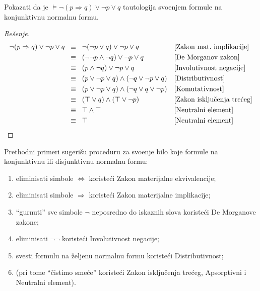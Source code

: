 \clearpage
    
    \begin{EX}
      Pokazati da je $\vDash \lnot(p \Rightarrow q) \lor \lnot p \lor q$ tautologija svo\dj enjem formule na konjunktivnu normalnu formu.
    \end{EX}
    \begin{proof}[Re\v senje]
      \begin{align*}
        \lnot(p \Rightarrow q) \lor \lnot p \lor q
        &\;\;\equiv\;\; \lnot(\lnot p \lor q) \lor \lnot p \lor q                   && \text{[Zakon mat.\ implikacije]}\\
        &\;\;\equiv\;\; (\lnot\lnot p \land \lnot q) \lor \lnot p \lor q            && \text{[De Morganov zakon]}\\
        &\;\;\equiv\;\; (p \land \lnot q) \lor \lnot p \lor q                       && \text{[Involutivnost negacije]}\\
        &\;\;\equiv\;\; (p \lor \lnot p \lor q) \land (\lnot q \lor \lnot p \lor q) && \text{[Distributivnost]}\\
        &\;\;\equiv\;\; (p \lor \lnot p \lor q) \land (\lnot q \lor q \lor \lnot p) && \text{[Komutativnost]}\\
        &\;\;\equiv\;\; (\top \lor q) \land (\top \lor \lnot p)                     && \text{[Zakon isklju\v cenja tre\'ceg]}\\
        &\;\;\equiv\;\; \top \land \top                                             && \text{[Neutralni element]}\\
        &\;\;\equiv\;\; \top                                                        && \text{[Neutralni element]}\qedhere
      \end{align*}
    \end{proof}
    
    Prethodni primeri sugeri\v su proceduru za svo\dj enje bilo koje formule na konjunktivnu ili disjunktivnu normalnu formu:
    \begin{enumerate}\itemsep -1pt
    \item eliminisati simbole $\Leftrightarrow$ koriste\'ci Zakon materijalne ekvivalencije;
    \item eliminisati simbole $\Rightarrow$ koriste\'ci Zakon materijalne implikacije;
    \item \enquote{gurnuti} sve simbole $\lnot$ neposredno do iskaznih slova koriste\'ci De Morganove zakone;
    \item eliminisati $\lnot \lnot$ koriste\'ci Involutivnost negacije;
    \item svesti formulu na \v zeljenu normalnu formu koriste\'ci Distributivnost;
    \item (pri tome \enquote{\v cistimo sme\'ce} koriste\'ci Zakon isklju\v cenja tre\'ceg, Apsorptivni i Neutralni element).
    \end{enumerate}
\fi



